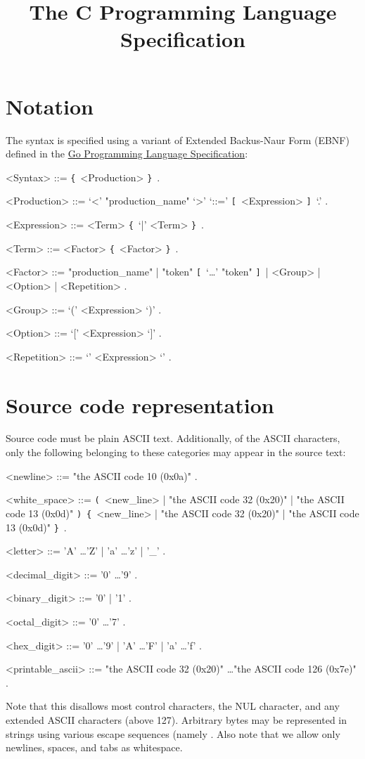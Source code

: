 \documentclass{article}
\title{The C Programming Language Specification}
\def\lrep{\synshortsoff\texttt{\{}\synshorts~}
\def\rrep{\synshortsoff\texttt{\}}\synshorts~}
\def\lopt{\synshortsoff\texttt{[}\synshorts~}
\def\ropt{\synshortsoff\texttt{]}\synshorts~}
\def\lgrp{\synshortsoff\texttt{(}\synshorts~}
\def\rgrp{\synshortsoff\texttt{)}\synshorts~}
\begin{document}
\maketitle

\section*{Notation}
The syntax is specified using a variant of Extended Backus-Naur Form (EBNF) defined in the \href{https://go.dev/ref/spec#Notation}{Go Programming Language Specification}:
\begin{grammar}
  <Syntax> ::= \lrep <Production> \rrep .
  
  <Production> ::= `<' "production_name" `>' `::=' \lopt <Expression> \ropt `.' .
  
  <Expression> ::= <Term> \lrep `|' <Term> \rrep .
  
  <Term> ::= <Factor> \lrep <Factor> \rrep .
  
  <Factor> ::= "production_name" | "token" \lopt `\ldots' "token" \ropt | <Group> | <Option> | <Repetition> .
  
  <Group> ::= `(' <Expression> `)' .
  
  <Option> ::= `[' <Expression> `]' .
  
  <Repetition> ::= `{' <Expression> `}' .

\end{grammar}
\section*{Source code representation}
Source code must be plain ASCII text. Additionally, of the ASCII
characters, only the following belonging to these categories may
appear in the source text:
\begin{grammar}
  <newline> ::= "the ASCII code 10 (0x0a)" .

  <white_space> ::= \lgrp <new_line> | "the ASCII code 32 (0x20)" | "the ASCII code 13 (0x0d)" \rgrp \lrep <new_line> | "the ASCII code 32 (0x20)" | "the ASCII code 13 (0x0d)" \rrep .

  <letter> ::= 'A' \ldots 'Z' | 'a' \ldots 'z' | '_' .

  <decimal_digit> ::= '0' \ldots '9' .

  <binary_digit> ::= '0' | '1' .

  <octal_digit> ::= '0' \ldots '7' .

  <hex_digit> ::= '0' \ldots '9' | 'A' \ldots 'F' | 'a' \ldots 'f' .

  <printable_ascii> ::= "the ASCII code 32 (0x20)" \ldots "the ASCII code 126 (0x7e)" .
  
\end{grammar}
Note that this disallows most control characters, the NUL character, and any
extended ASCII characters (above 127). Arbitrary bytes may be represented in
strings using various escape sequences (namely . Also
note that we allow only newlines, spaces, and tabs as whitespace.
  
\end{document}
